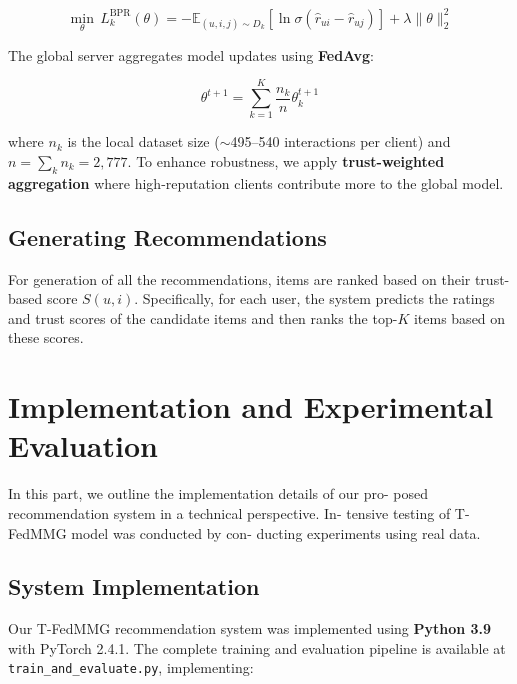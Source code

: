 \documentclass[journal]{IEEEtran} %
\begin{document}
\begin{equation}
\min_\theta \, L_k^{\text{BPR}}(\theta) = -\mathbb{E}_{(u,i,j) \sim D_k} \left[ \ln \sigma(\hat{r}_{ui} - \hat{r}_{uj}) \right] + \lambda \|\theta\|^2_2
\end{equation}

The global server aggregates model updates using \textbf{FedAvg}:

\begin{equation}
\theta^{t+1} = \sum_{k=1}^{K} \frac{n_k}{n} \theta_k^{t+1}
\end{equation}

where $n_k$ is the local dataset size ($\sim$495–540 interactions per client) and $n = \sum_k n_k = 2,777$. To enhance robustness, we apply \textbf{trust-weighted aggregation} where high-reputation clients contribute more to the global model.

\subsection{Generating Recommendations}
For generation of all the recommendations, items are ranked based on their trust-based score $S(u,i)$. Specifically, for each user, the system predicts the ratings and trust scores of the candidate items and then ranks the top-$K$ items based on these scores.


\section{Implementation and Experimental Evaluation}

In this part, we outline the implementation details of our pro-
posed recommendation system in a technical perspective. In-
tensive testing of T-FedMMG model was conducted by con-
ducting experiments using real data.

\subsection{System Implementation}
Our T-FedMMG recommendation system was implemented using \textbf{Python 3.9} with PyTorch 2.4.1. The complete training and evaluation pipeline is available at \texttt{train\_and\_evaluate.py}, implementing:
\end{document}
